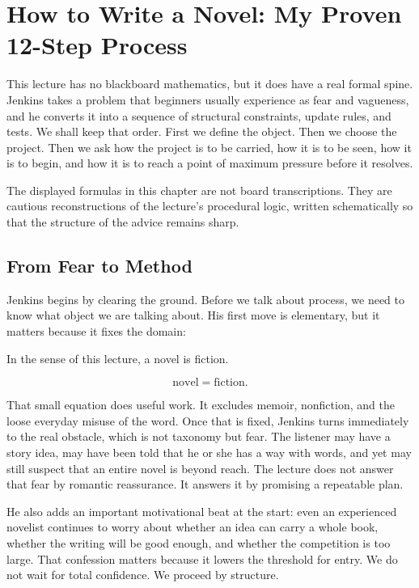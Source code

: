 \chapter{How to Write a Novel: My Proven 12-Step Process}

This lecture has no blackboard mathematics, but it does have a real formal spine. Jenkins takes a problem that beginners usually experience as fear and vagueness, and he converts it into a sequence of structural constraints, update rules, and tests. We shall keep that order. First we define the object. Then we choose the project. Then we ask how the project is to be carried, how it is to be seen, how it is to begin, and how it is to reach a point of maximum pressure before it resolves.

\begin{remark}
The displayed formulas in this chapter are not board transcriptions. They are cautious reconstructions of the lecture's procedural logic, written schematically so that the structure of the advice remains sharp.
\end{remark}

\section{From Fear to Method}

Jenkins begins by clearing the ground. Before we talk about process, we need to know what object we are talking about. His first move is elementary, but it matters because it fixes the domain:

\begin{definition}
In the sense of this lecture, a novel is fiction.
\end{definition}

\begin{equation}
\text{novel}=\text{fiction}.
\end{equation}

That small equation does useful work. It excludes memoir, nonfiction, and the loose everyday misuse of the word. Once that is fixed, Jenkins turns immediately to the real obstacle, which is not taxonomy but fear. The listener may have a story idea, may have been told that he or she has a way with words, and yet may still suspect that an entire novel is beyond reach. The lecture does not answer that fear by romantic reassurance. It answers it by promising a repeatable plan.

He also adds an important motivational beat at the start: even an experienced novelist continues to worry about whether an idea can carry a whole book, whether the writing will be good enough, and whether the competition is too large. That confession matters because it lowers the threshold for entry. We do not wait for total confidence. We proceed by structure.

